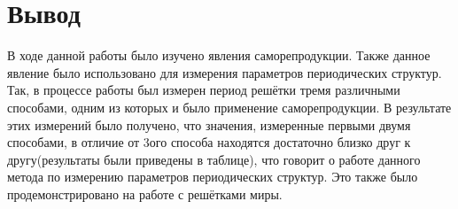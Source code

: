 \documentclass[a4paper,12pt]{article}
\begin{document}
\section{Вывод}
В ходе данной работы было изучено явления саморепродукции. Также данное явление было использовано для измерения параметров периодических структур. Так, в процессе работы был измерен период решётки тремя различными способами, одним из которых и было применение саморепродукции. В результате этих измерений было получено, что значения, измеренные первыми двумя способами, в отличие от 3ого способа находятся достаточно близко друг к другу(результаты были приведены в таблице), что говорит о работе данного метода по измерению параметров периодических структур. Это также было продемонстрировано на работе с решётками миры. 
\end{document}
